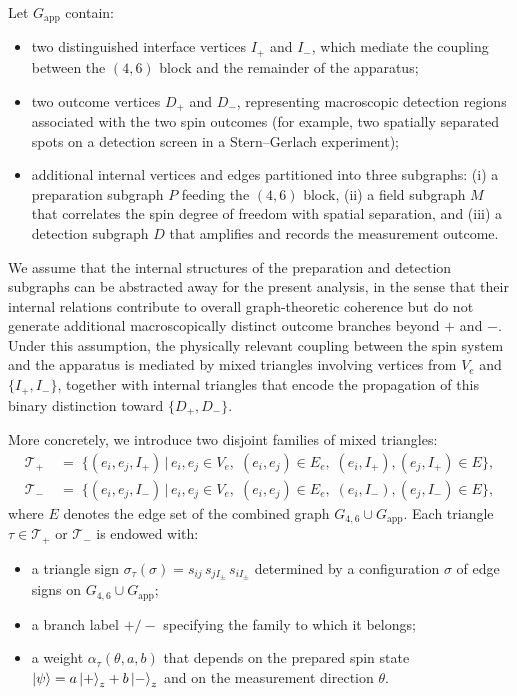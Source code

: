 \documentclass[11pt,a4paper]{article}
\numberwithin{equation}{section}
\begin{document}
Let $G_{\mathrm{app}}$ contain:
\begin{itemize}
  \item two distinguished interface vertices $I_+$ and $I_-$, which mediate the coupling between the $(4,6)$ block and the remainder of the apparatus;
  \item two outcome vertices $D_+$ and $D_-$, representing macroscopic detection regions associated with the two spin outcomes (for example, two spatially separated spots on a detection screen in a Stern--Gerlach experiment);
  \item additional internal vertices and edges partitioned into three subgraphs: (i) a preparation subgraph $P$ feeding the $(4,6)$ block, (ii) a field subgraph $M$ that correlates the spin degree of freedom with spatial separation, and (iii) a detection subgraph $D$ that amplifies and records the measurement outcome.
\end{itemize}

We assume that the internal structures of the preparation and detection subgraphs can be abstracted away for the present analysis, in the sense that their internal relations contribute to overall graph-theoretic coherence but do not generate additional macroscopically distinct outcome branches beyond $+$ and $-$. Under this assumption, the physically relevant coupling between the spin system and the apparatus is mediated by mixed triangles involving vertices from $V_e$ and $\{I_+,I_-\}$, together with internal triangles that encode the propagation of this binary distinction toward $\{D_+,D_-\}$.

More concretely, we introduce two disjoint families of mixed triangles:
\begin{align}
  \mathcal{T}_+ &\;=\; \big\{ (e_i,e_j,I_+) \,\big|\, e_i,e_j\in V_e,\; (e_i,e_j)\in E_e,\; (e_i,I_+),(e_j,I_+)\in E \big\},\\[0.3em]
  \mathcal{T}_- &\;=\; \big\{ (e_i,e_j,I_-) \,\big|\, e_i,e_j\in V_e,\; (e_i,e_j)\in E_e,\; (e_i,I_-),(e_j,I_-)\in E \big\},
\end{align}
where $E$ denotes the edge set of the combined graph $G_{4,6}\cup G_{\mathrm{app}}$. Each triangle $\tau\in\mathcal{T}_+$ or $\mathcal{T}_-$ is endowed with:
\begin{itemize}
  \item a triangle sign $\sigma_\tau(\sigma)=s_{ij}\,s_{jI_\pm}\,s_{iI_\pm}$ determined by a configuration $\sigma$ of edge signs on $G_{4,6}\cup G_{\mathrm{app}}$;
  \item a branch label $+/-$ specifying the family to which it belongs;
  \item a weight $\alpha_\tau(\theta,a,b)$ that depends on the prepared spin state $\ket{\psi}=a\ket{+}_z+b\ket{-}_z$ and on the measurement direction $\theta$.
\end{itemize}
\end{document}
